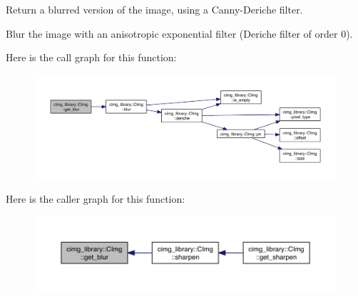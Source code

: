Return a blurred version of the image, using a Canny-\/\-Deriche filter. 

Blur the image with an anisotropic exponential filter (Deriche filter of order 0). 

Here is the call graph for this function\-:
\nopagebreak
\begin{figure}[H]
\begin{center}
\leavevmode
\includegraphics[width=350pt]{structcimg__library_1_1_c_img_ad5de3e55741aaa3d81b93a1c843f434d_cgraph}
\end{center}
\end{figure}




Here is the caller graph for this function\-:
\nopagebreak
\begin{figure}[H]
\begin{center}
\leavevmode
\includegraphics[width=350pt]{structcimg__library_1_1_c_img_ad5de3e55741aaa3d81b93a1c843f434d_icgraph}
\end{center}
\end{figure}


